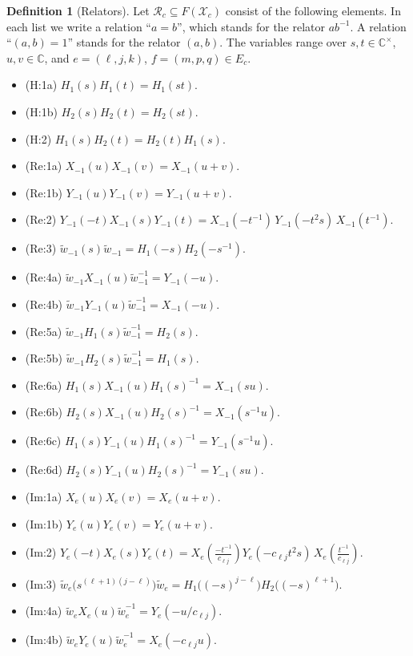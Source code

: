 \documentclass[11pt]{article}
\theoremstyle{definition}
\newtheorem{definition}[theorem]{Definition}
\theoremstyle{remark}
\begin{document}
\begin{definition}[Relators]
Let $\mathcal{R}_c\subseteq F(\mathcal{X}_c)$ consist of the following elements. In each list we write a relation ``$a=b$'', which stands for the relator $ab^{-1}$. A relation ``$(a,b)=1$'' stands for the relator $(a,b)$. The variables range over $s,t\in\mathbb{C}^\times$, $u,v\in\mathbb{C}$, and $e=(\ell,j,k)$, $f=(m,p,q)\in E_c$.
\begin{itemize}
\item (H:1a) $H_1(s)H_1(t)=H_1(st)$.
\item (H:1b) $H_2(s)H_2(t)=H_2(st)$.
\item (H:2) $H_1(s)H_2(t)=H_2(t)H_1(s)$.
\item (Re:1a) $X_{-1}(u)X_{-1}(v)=X_{-1}(u+v)$.
\item (Re:1b) $Y_{-1}(u)Y_{-1}(v)=Y_{-1}(u+v)$.
\item (Re:2) $Y_{-1}(-t)X_{-1}(s)Y_{-1}(t)=X_{-1}(-t^{-1})\,Y_{-1}(-t^2s)\,X_{-1}(t^{-1})$.
\item (Re:3) $\widetilde w_{-1}(s)\widetilde w_{-1}=H_1(-s)H_2(-s^{-1})$.
\item (Re:4a) $\widetilde w_{-1}X_{-1}(u)\widetilde w_{-1}^{-1}=Y_{-1}(-u)$.
\item (Re:4b) $\widetilde w_{-1}Y_{-1}(u)\widetilde w_{-1}^{-1}=X_{-1}(-u)$.
\item (Re:5a) $\widetilde w_{-1}H_1(s)\widetilde w_{-1}^{-1}=H_2(s)$.
\item (Re:5b) $\widetilde w_{-1}H_2(s)\widetilde w_{-1}^{-1}=H_1(s)$.
\item (Re:6a) $H_1(s)X_{-1}(u)H_1(s)^{-1}=X_{-1}(su)$.
\item (Re:6b) $H_2(s)X_{-1}(u)H_2(s)^{-1}=X_{-1}(s^{-1}u)$.
\item (Re:6c) $H_1(s)Y_{-1}(u)H_1(s)^{-1}=Y_{-1}(s^{-1}u)$.
\item (Re:6d) $H_2(s)Y_{-1}(u)H_2(s)^{-1}=Y_{-1}(su)$.
\item (Im:1a) $X_e(u)X_e(v)=X_e(u+v)$.
\item (Im:1b) $Y_e(u)Y_e(v)=Y_e(u+v)$.
\item (Im:2) $Y_e(-t)X_e(s)Y_e(t)=X_e\!\left(\frac{-t^{-1}}{c_{\ell j}}\right)Y_e(-c_{\ell j}t^2s)\,X_e\!\left(\frac{t^{-1}}{c_{\ell j}}\right)$.
\item (Im:3) $\widetilde w_e\big(s^{(\ell+1)(j-\ell)}\big)\widetilde w_e=H_1\big((-s)^{j-\ell}\big)H_2\big((-s)^{\ell+1}\big)$.
\item (Im:4a) $\widetilde w_eX_e(u)\widetilde w_e^{-1}=Y_e(-u/c_{\ell j})$.
\item (Im:4b) $\widetilde w_eY_e(u)\widetilde w_e^{-1}=X_e(-c_{\ell j}u)$.

\end{itemize}
\end{definition}
\end{document}
